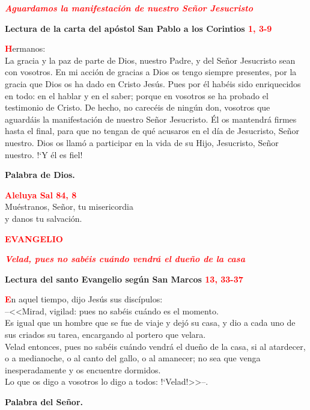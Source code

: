 \documentclass[12pt, letterpaper]{report}
\begin{document}
\begin{center}
\large {\bfseries \textit{ \textcolor{red}{Aguardamos la manifestaci\'on de nuestro Se\~nor Jesucristo}}}
\end{center}

\Large {\bfseries Lectura de la carta del ap\'ostol San Pablo a los Corintios \hspace{1cm} \textcolor{red}{1, 3-9}}

\lettrine[lines=1]{\bfseries \textcolor{red}{H}}{}\Large ermanos:\\
La gracia y la paz de parte de Dios, nuestro Padre, y del Se\~nor Jesucristo sean con vosotros. En mi acci\'on de gracias a Dios os tengo siempre presentes, por la gracia que Dios os ha dado en Cristo Jes\'us. Pues por \'el hab\'eis sido enriquecidos en todo: en el hablar y en el saber; porque en vosotros se ha probado el testimonio de Cristo. De hecho, no carec\'eis de ning\'un don, vosotros que aguard\'ais la manifestaci\'on de nuestro Se\~nor Jesucristo. \'El os mantendr\'a firmes hasta el final, para que no tengan de qu\'e acusaros en el d\'ia de Jesucristo, Se\~nor nuestro. Dios os llam\'o a participar en la vida de su Hijo, Jesucristo, Se\~nor nuestro. !`Y \'el es fiel!

{\bfseries Palabra de Dios.}


\begin{center}
\Large {\bfseries \textcolor{red}{Aleluya \hspace{1cm} Sal 84, 8}} \\
Mu\'estranos, Se\~nor, tu misericordia\\
y danos tu salvaci\'on.
\end{center}

\newpage

\begin{center}
\Large {\bfseries \textcolor{red}{EVANGELIO}}
\end{center}

\begin{center}
\large {\bfseries \textit{ \textcolor{red}{Velad, pues no sab\'eis cu\'ando vendr\'a el due\~no de la casa}}}
\end{center}

\Huge \textcolor{red}{} \Large {\bfseries Lectura del santo Evangelio seg\'un San Marcos \hspace{1cm} \textcolor{red}{13, 33-37}}

\lettrine[lines=1]{\bfseries \textcolor{red}{E}}{}\Large n aquel tiempo, dijo Jes\'us sus disc\'ipulos:\\
--<<Mirad, vigilad: pues no sab\'eis cu\'ando es el momento.\\
Es igual que un hombre que se fue de viaje y dej\'o su casa, y dio a cada uno de sus criados su tarea, encargando al portero que velara.\\
Velad entonces, pues no sab\'eis cu\'ando vendr\'a el due\~no de la casa, si al atardecer, o a medianoche, o al canto del gallo, o al amanecer; no sea que venga inesperadamente y os encuentre dormidos.\\
Lo que os digo a vosotros lo digo a todos: !`Velad!>>--.

{\bfseries Palabra del Se\~nor.}
\end{document}
